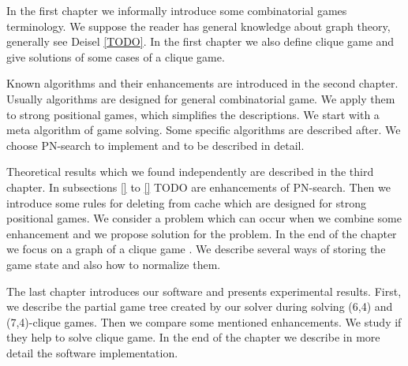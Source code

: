 In the first chapter we informally introduce some combinatorial
games terminology. We suppose the reader has general knowledge about graph theory, 
generally see Deisel \ref{TODO}. In the first chapter we also define clique game and give
solutions of some cases of a clique game.

Known algorithms and their enhancements are introduced in the second chapter. Usually
algorithms are designed for general combinatorial game. We apply them to
strong positional games, which simplifies the descriptions. We start with a meta
algorithm of game solving. Some specific algorithms are described after. We choose PN-search to
implement and to be described in detail.

Theoretical results which we found independently are described in the third chapter.
In subsections \ref{} to \ref{} TODO are enhancements of PN-search. Then we introduce some rules for
deleting from cache which are designed for strong positional games. We consider
a problem which can occur when we combine some enhancement and we
propose solution for the problem. In the end of the chapter we focus on
a graph of a clique game . We describe several ways of storing
the game state and also how to normalize them.

The last chapter introduces our software and presents experimental results.
First, we describe the partial game tree created by our solver during solving
(6,4) and (7,4)-clique games. Then we compare some mentioned enhancements. We
study if they help to solve clique game. In the end of the chapter we describe in
more detail the software implementation.
